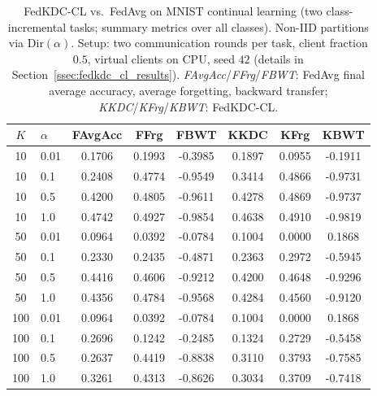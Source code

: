 \begin{table}[t]
\centering
\footnotesize
\caption{FedKDC-CL vs.\ FedAvg on MNIST continual learning (two class-incremental tasks; summary metrics over all classes).
Non-IID partitions via $\mathrm{Dir}(\alpha)$.
Setup: two communication rounds per task, client fraction $0.5$, virtual clients on CPU, seed $42$
(details in Section~\ref{ssec:fedkdc_cl_results}).
\emph{FAvgAcc}/\emph{FFrg}/\emph{FBWT}: FedAvg final average accuracy, average forgetting, backward transfer;
\emph{KKDC}/\emph{KFrg}/\emph{KBWT}: FedKDC-CL.}
\label{tab:fedkdc_grid_dirichlet}
\renewcommand{\arraystretch}{1.12}
\begin{tabular}{@{}c l cccccc@{}}
\toprule
$K$ & $\alpha$ & \textbf{FAvgAcc} & \textbf{FFrg} & \textbf{FBWT}
& \textbf{KKDC} & \textbf{KFrg} & \textbf{KBWT} \\
\midrule
10 & 0.01 & 0.1706 & 0.1993 & -0.3985 & 0.1897 & 0.0955 & -0.1911 \\
10 & 0.1 & 0.2408 & 0.4774 & -0.9549 & 0.3414 & 0.4866 & -0.9731 \\
10 & 0.5 & 0.4200 & 0.4805 & -0.9611 & 0.4278 & 0.4869 & -0.9737 \\
10 & 1.0 & 0.4742 & 0.4927 & -0.9854 & 0.4638 & 0.4910 & -0.9819 \\
50 & 0.01 & 0.0964 & 0.0392 & -0.0784 & 0.1004 & 0.0000 & 0.1868 \\
50 & 0.1 & 0.2330 & 0.2435 & -0.4871 & 0.2363 & 0.2972 & -0.5945 \\
50 & 0.5 & 0.4416 & 0.4606 & -0.9212 & 0.4200 & 0.4648 & -0.9296 \\
50 & 1.0 & 0.4356 & 0.4784 & -0.9568 & 0.4284 & 0.4560 & -0.9120 \\
100 & 0.01 & 0.0964 & 0.0392 & -0.0784 & 0.1004 & 0.0000 & 0.1868 \\
100 & 0.1 & 0.2696 & 0.1242 & -0.2485 & 0.1324 & 0.2729 & -0.5458 \\
100 & 0.5 & 0.2637 & 0.4419 & -0.8838 & 0.3110 & 0.3793 & -0.7585 \\
100 & 1.0 & 0.3261 & 0.4313 & -0.8626 & 0.3034 & 0.3709 & -0.7418 \\
\bottomrule
\end{tabular}
\end{table}
